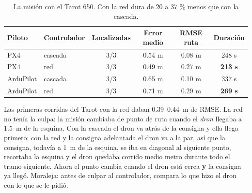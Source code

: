 \begin{table}[H]
\centering\small
\begin{tabular}{llcccc}
\toprule
\textbf{Piloto} & \textbf{Controlador} & \textbf{Localizadas} & \textbf{Error medio} & \textbf{RMSE ruta} & \textbf{Duración} \\ \midrule
PX4 & cascada & 3/3 & 0.54 m & 0.08 m & 248 s \\
PX4 & red & 3/3 & 0.49 m & 0.27 m & \textbf{213 s} \\
ArduPilot & cascada & 3/3 & 0.65 m & 0.10 m & 337 s \\
ArduPilot & red & 3/3 & 0.71 m & 0.29 m & \textbf{269 s} \\
\bottomrule
\end{tabular}
\caption{La misión con el Tarot 650. Con la red dura de 20 a 37 \% menos que con la cascada.}
\end{table}

\begin{nota}
Las primeras corridas del Tarot con la red daban 0.39--0.44~m de RMSE. La red no tenía la culpa: la
misión cambiaba de punto de ruta cuando el \emph{dron} llegaba a 1.5~m de la esquina. Con la cascada el
dron va atrás de la consigna y ella llega primero; con la red y la consigna adelantada el dron va a la
par, así que la consigna, todavía a 1~m de la esquina, se iba en diagonal al siguiente punto, recortaba
la esquina y el dron quedaba corrido medio metro durante todo el tramo siguiente. Ahora el punto cambia
cuando el dron está cerca \textbf{y} la consigna ya llegó. Moraleja: antes de culpar al controlador,
compara lo que hizo el dron con lo que se le pidió.
\end{nota}
